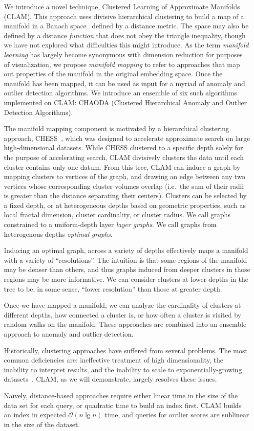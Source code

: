 We introduce a novel technique, Clustered Learning of Approximate Manifolds (CLAM).
This approach uses divisive hierarchical clustering to build a map of a manifold in a Banach space~\cite{banach1929fonctionnelles} defined by a distance metric.
The space may also be defined by a distance \textit{function} that does not obey the triangle inequality, though we have not explored what difficulties this might introduce.
As the term \emph{manifold learning} has largely become synonymous with dimension reduction for purposes of visualization, we propose \emph{manifold mapping} to refer to approaches that map out properties of the manifold in the original embedding space.
Once the manifold has been mapped, it can be used as input for a myriad of anomaly and outlier detection algorithms.
We introduce an ensemble of six such algorithms implemented on CLAM: CHAODA (Clustered Hierarchical Anomaly and Outlier Detection Algorithms).

The manifold mapping component is motivated by a hierarchical clustering approach, CHESS~\cite{ishaq2019clustered}, which was designed to accelerate approximate search on large high-dimensional datasets.
While CHESS clustered to a specific depth solely for the purpose of accelerating search, CLAM
divisively clusters the data until each cluster contains only one datum.
From this tree, CLAM can induce a graph by mapping clusters to vertices of the graph, and drawing an edge between any two vertices whose corresponding cluster volumes overlap (i.e.\ the sum of their radii is greater than the distance separating their centers).
Clusters can be selected by a fixed depth, or at heterogeneous depths based on geometric properties, such as local fractal dimension, cluster cardinality, or cluster radius.
We call graphs constrained to a uniform-depth layer \textit{layer graphs}.
We call graphs from heterogenous depths \textit{optimal graphs}.

Inducing an optimal graph, across a variety of depths effectively maps a manifold with a variety of ``resolutions''.
The intuition is that some regions of the manifold may be denser than others, and thus graphs induced from deeper clusters in those regions may be more informative.
We can consider clusters at lower depths in the tree to be, in some sense, ``lower resolution'' than those at greater depth.

Once we have mapped a manifold, we can analyze the cardinality of clusters at different depths, how connected a cluster is, or how often a cluster is visited by random walks on the manifold.
These approaches are combined into an ensemble approach to anomaly and outlier detection.

Historically, clustering approaches have suffered from several problems.
The most common deficiencies are:
ineffective treatment of high dimensionality,
the inability to interpret results, and
the inability to scale to exponentially-growing datasets~\cite{agrawal1998automatic}.
CLAM, as we will demonstrate, largely resolves these issues.

Na\"ively, distance-based approaches require either linear time in the size of the data set for each query,
or quadratic time to build an index first.
CLAM builds an index in expected $\mathcal{O}(n \lg n)$ time, and queries for outlier scores are sublinear in the size of the dataset.
